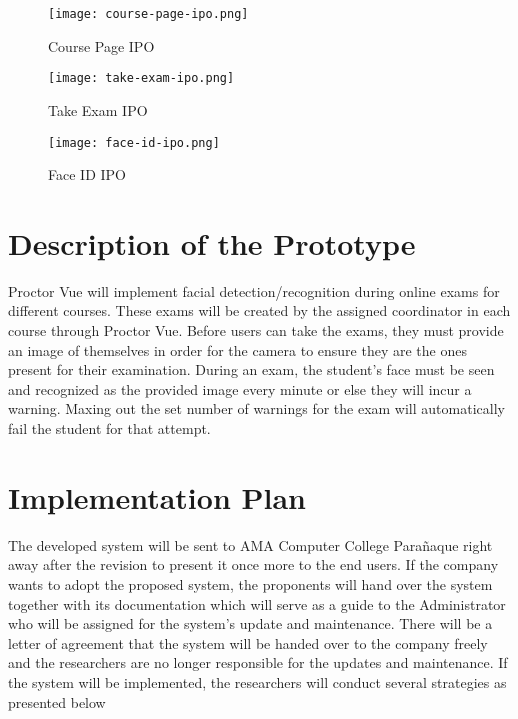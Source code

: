 \begin{figure}[h!]
    \begin{center}
        \texttt{[image: course-page-ipo.png]}
        \caption{Course Page IPO}
    \end{center}
\end{figure}

\begin{figure}[h!]
    \begin{center}
        \texttt{[image: take-exam-ipo.png]}
        \caption{Take Exam IPO}
    \end{center}
\end{figure}

\pagebreak

\begin{figure}[h!]
    \begin{center}
        \texttt{[image: face-id-ipo.png]}
        \caption{Face ID IPO}
    \end{center}
\end{figure}

\section{Description of the Prototype}

Proctor Vue will implement facial detection/recognition during online exams for different courses.
These exams will be created by the assigned coordinator in each course through Proctor Vue.
Before users can take the exams, they must provide an image of themselves in order for the camera to ensure they are the ones present for their examination.
During an exam, the student's face must be seen and recognized as the provided image every minute or else they will incur a warning.
Maxing out the set number of warnings for the exam will automatically fail the student for that attempt.

\section{Implementation Plan}

The developed system will be sent to AMA Computer College Parañaque right away after the revision to present it once more to the end users.
If the company wants to adopt the proposed system, the proponents will hand over the system together with its documentation which will serve as a guide to the Administrator who will be assigned for the system’s update and maintenance.
There will be a letter of agreement that the system will be handed over to the company freely and the researchers are no longer responsible for the updates and maintenance.
If the system will be implemented, the researchers will conduct several strategies as presented below

